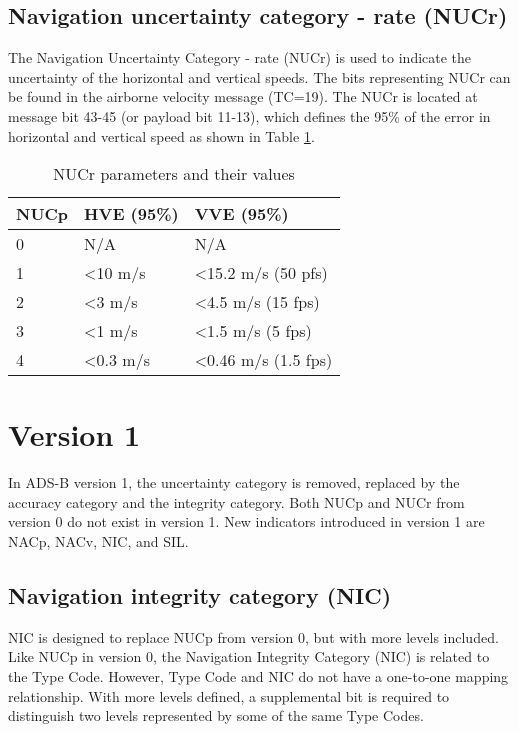 \subsection{Navigation uncertainty category - rate (NUCr)}

The Navigation Uncertainty Category - rate (NUCr) is used to indicate the uncertainty of the horizontal and vertical speeds. The bits representing NUCr can be found in the airborne velocity message (TC=19). The NUCr is located at message bit 43-45 (or payload bit 11-13), which defines the 95\% of the error in horizontal and vertical speed as shown in Table \ref{tb:nucr-params}.

\begin{table}[ht]
\caption{NUCr parameters and their values}
\label{tb:nucr-params}
\begin{tabular}{|l|l|l|}
\hline
\textbf{NUCp} & \textbf{HVE (95\%)} & \textbf{VVE (95\%)} \\ \hline
0 & N/A & N/A \\ \hline
1 & \textless 10 m/s & \textless 15.2 m/s (50 pfs) \\ \hline
2 & \textless 3 m/s & \textless 4.5 m/s (15 fps) \\ \hline
3 & \textless 1 m/s & \textless 1.5 m/s (5 fps) \\ \hline
4 & \textless 0.3 m/s & \textless 0.46 m/s (1.5 fps) \\ \hline
\end{tabular}
\end{table}



\section{Version 1}


In ADS-B version 1, the uncertainty category is removed, replaced by the accuracy category and the integrity category. Both NUCp and NUCr from version 0 do not exist in version 1. New indicators introduced in version 1 are NACp, NACv, NIC, and SIL.


\subsection{Navigation integrity category (NIC)}

NIC is designed to replace NUCp from version 0, but with more levels included. Like NUCp in version 0, the Navigation Integrity Category (NIC) is related to the Type Code. However, Type Code and NIC do not have a one-to-one mapping relationship. With more levels defined, a supplemental bit is required to distinguish two levels represented by some of the same Type Codes.


